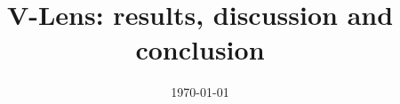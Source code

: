 \documentclass[11pt]{article}
\title{V-Lens: results, discussion and conclusion}
\date{\today}
\begin{document}
\maketitle


\clearpage
\FloatBarrier


\clearpage
\appendix

\end{document}
